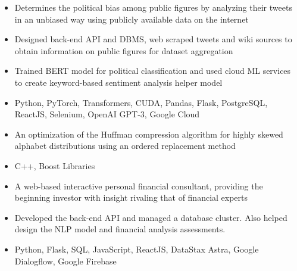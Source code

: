 \documentclass[11pt,letterpaper]{article}
\begin{document}
  \ifpolitify
    {\fontsize{12}{12}}

    \begin{itemize}
      \item{Determines the political bias among public figures by analyzing their tweets in an unbiased way using publicly available data on the internet}
      \item{Designed back-end API and DBMS, web scraped tweets and wiki sources to obtain information on public figures for dataset aggregation}
      \item{Trained BERT model for political classification and used cloud ML services to create keyword-based sentiment analysis helper model}
      \item{
        {}
        Python, PyTorch, Transformers, CUDA, Pandas, Flask, PostgreSQL, ReactJS, Selenium, OpenAI GPT-3, Google Cloud
      }
    \end{itemize}
  \fi

  \ifhuffskew
    {\fontsize{12}{12}}

    \begin{itemize}
      \item{An optimization of the Huffman compression algorithm for highly skewed alphabet distributions using an ordered replacement method}
      \item{
        {}
        C++, Boost Libraries
      }
    \end{itemize}
  \fi

  \iffizz
    {\fontsize{12}{12}}

    \begin{itemize}
      \item{A web-based interactive personal financial consultant, providing the beginning investor with insight rivaling that of financial experts}
      \item{Developed the back-end API and managed a database cluster. Also helped design the NLP model and financial analysis assessments.}
      \item{
        {}
        Python, Flask, SQL, JavaScript, ReactJS, DataStax Astra, Google Dialogflow, Google Firebase
      }
    \end{itemize}
  \fi
\end{document}
